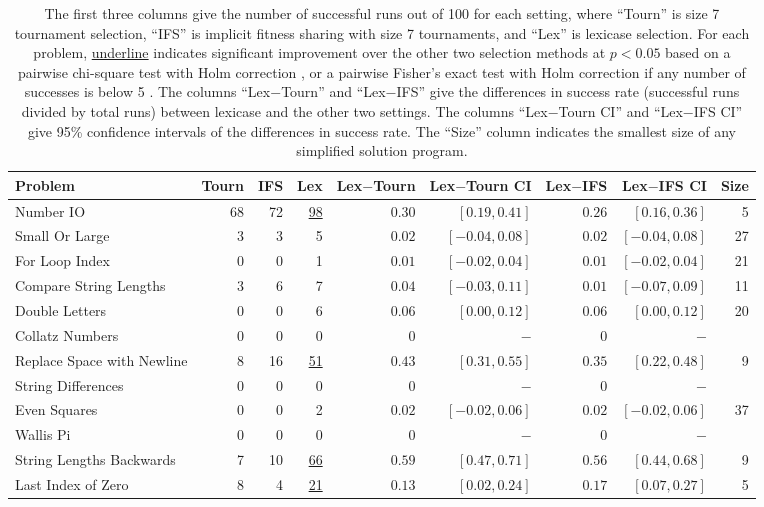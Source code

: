 \documentclass{sig-alternate}
\begin{document}
\begin{table*}[t]
\centering
\caption{The first three columns give the number of successful runs out of 100 for each setting, where ``Tourn'' is size 7 tournament selection, ``IFS'' is implicit fitness sharing with size 7 tournaments, and ``Lex'' is lexicase selection. For each problem, \underline{underline} indicates significant improvement over the other two selection methods at $p < 0.05$ based on a pairwise chi-square test with Holm correction \cite{R}, or a pairwise Fisher's exact test with Holm correction if any number of successes is below 5 \cite{fmsb}. The columns ``Lex$-$Tourn'' and ``Lex$-$IFS'' give the differences in success rate (successful runs divided by total runs) between lexicase and the other two settings. The columns ``Lex$-$Tourn CI'' and ``Lex$-$IFS CI'' give 95\% confidence intervals of the differences in success rate. The ``Size'' column indicates the smallest size of any simplified solution program.}
\label{tableResults}
\begin{tabular}{lrrr|rrrr|r}
\toprule
Problem & Tourn & IFS & Lex & Lex$-$Tourn & Lex$-$Tourn CI & Lex$-$IFS & Lex$-$IFS CI & Size \tabularnewline
\midrule
Number IO                  & 68      & 72  & \underline{98} & $0.30$ & $[0.19, 0.41]$ & $0.26$ & $[0.16, 0.36]$ & 5 \tabularnewline
Small Or Large             & 3       & 3   & 5         & $0.02$ & $[-0.04, 0.08]$ & $0.02$ & $[-0.04, 0.08]$ & 27 \tabularnewline
For Loop Index             & 0       & 0   & 1      & $0.01$ & $[-0.02, 0.04]$ & $0.01$ & $[-0.02, 0.04]$ & 21 \tabularnewline
Compare String Lengths     & 3       & 6   & 7      & $0.04$ & $[-0.03, 0.11]$ & $0.01$ & $[-0.07, 0.09]$ & 11 \tabularnewline
Double Letters             & 0       & 0   & 6  & $0.06$ & $[0.00, 0.12]$ & $0.06$ & $[0.00, 0.12]$ & 20 \tabularnewline
Collatz Numbers            & 0       & 0   & 0        &   $0$ & $-$ & $0$ & $-$ &  \tabularnewline
Replace Space with Newline & 8       & 16  & \underline{51}       & $0.43$ & $[0.31, 0.55]$ & $0.35$ & $[0.22, 0.48]$ & 9 \tabularnewline
String Differences         & 0       & 0   & 0        & $0$ & $-$ & $0$ & $-$ &  \tabularnewline
Even Squares               & 0       & 0   & 2        & $0.02$ & $[-0.02, 0.06]$ & $0.02$ & $[-0.02, 0.06]$ & 37 \tabularnewline
Wallis Pi                  & 0       & 0   & 0        &   $0$ & $-$ & $0$ & $-$ &  \tabularnewline
String Lengths Backwards   & 7       & 10  & \underline{66}       & $0.59$ & $[0.47, 0.71]$ & $0.56$ & $[0.44, 0.68]$ & 9 \tabularnewline
Last Index of Zero         & 8       & 4   & \underline{21}       & $0.13$ & $[0.02, 0.24]$ & $0.17$ & $[0.07, 0.27]$ & 5 \tabularnewline

\end{tabular}
\end{table*}
\end{document}
